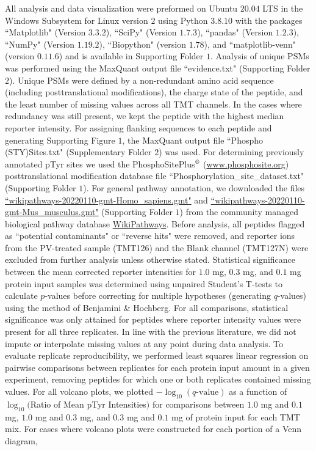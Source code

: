 \documentclass[journal=jprobs,manuscript=article]{achemso}
\begin{document}
All analysis and data visualization were preformed on Ubuntu $20.04$ LTS in the Windows Subsystem for Linux version $2$ using Python $3.8.10$ with the packages ``Matplotlib" (Version $3.3.2$), ``SciPy" (Version $1.7.3$), ``pandas" (Version $1.2.3$), ``NumPy" (Version $1.19.2$), ``Biopython" (version $1.78$), and ``matplotlib-venn" (version $0.11.6$) and is available in Supporting Folder $1$. Analysis of unique PSMs was performed using the MaxQuant output file ``evidence.txt" (Supporting Folder $2$). Unique PSMs were defined by a non-redundant amino acid sequence (including posttranslational modifications), the charge state of the peptide, and the least number of missing values across all TMT channels. In the cases where redundancy was still present, we kept the peptide with the highest median reporter intensity. For assigning flanking sequences to each peptide and generating Supporting Figure $1$, the MaxQuant output file ``Phospho (STY)Sites.txt" (Supplementary Folder $2$) was used. For determining previously annotated pTyr sites we used the PhosphoSitePlus$^{\text{\textregistered}}$ (\href{www.phosphosite.org}{www.phosphosite.org})\cite{hornbeck2015phosphositeplus} posttranslational modification database file ``Phosphorylation\_site\_dataset.txt" (Supporting Folder $1$). For general pathway annotation, we downloaded the files \href{https://wikipathways-data.wmcloud.org/20220110/gmt/wikipathways-20220110-gmt-Homo_sapiens.gmt}{``wikipathways-20220110-gmt-Homo\_sapiens.gmt"} and \href{https://wikipathways-data.wmcloud.org/20220110/gmt/wikipathways-20220110-gmt-Mus_musculus.gmt}{``wikipathways-20220110-gmt-Mus\_musculus.gmt"} (Supporting Folder $1$) from the community managed biological pathway database \href{https://www.wikipathways.org/index.php/WikiPathways}{WikiPathways}\cite{martens2021wikipathways}.  Before analysis, all peptides flagged as ``potential contaminants" or ``reverse hits" were removed, and reporter ions from the PV-treated sample (TMT126) and the Blank channel (TMT127N) were excluded from further analysis unless otherwise stated. Statistical significance between the mean corrected reporter intensities for $1.0$ mg, $0.3$ mg, and $0.1$ mg protein input samples was determined using unpaired Student's T-tests to calculate $p$-values before correcting for multiple hypotheses (generating $q$-values) using the method of Benjamini \& Hochberg\cite{benjhoch}. For all comparisons, statistical significance was only attained for peptides where reporter intensity values were present for all three replicates. In line with the previous literature, we did not impute or interpolate missing values at any point during data analysis\cite{chua2020tandem,chua2021ovalbumin}. To evaluate replicate reproducibility, we performed least squares linear regression\cite{grus2019data} on pairwise comparisons between replicates for each protein input amount in a given experiment, removing peptides for which one or both replicates contained missing values. For all volcano plots, we plotted $-\log_{10}(q\text{-value})$ as a function of $\log_{10}($Ratio of Mean pTyr Intensities$)$ for comparisons between $1.0$ mg and $0.1$ mg, $1.0$ mg and $0.3$ mg, and $0.3$ mg and $0.1$ mg of protein input for each TMT mix. For cases where volcano plots were constructed for each portion of a Venn diagram, 
\end{document}
